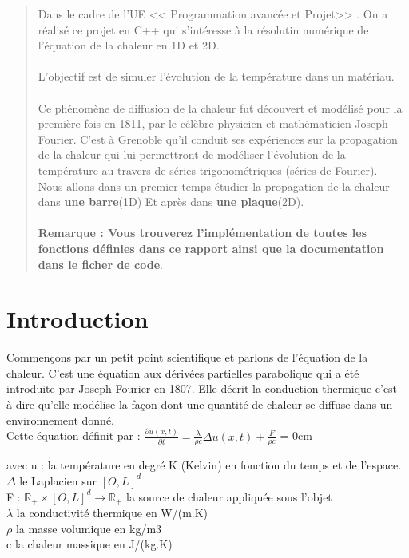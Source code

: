 \documentclass[french]{report}
\begin{document}
\begin{abstract}
Dans le cadre de l'UE << Programmation avancée et Projet>> . On a réalisé ce projet  en C++ qui s'intéresse à la résolutin numérique de l'équation de la chaleur en 1D et 2D.\\\\
L'objectif est de simuler l’évolution de la température dans un
matériau.\\\\
Ce phénomène de diffusion de la chaleur fut découvert et modélisé pour la première fois
en 1811, par le célèbre physicien et mathématicien Joseph Fourier. C'est à Grenoble qu'il
conduit ses expériences sur la propagation de la chaleur qui lui permettront de modéliser
l'évolution de la température au travers de séries trigonométriques (séries de Fourier). \\
Nous allons dans un premier temps  étudier la propagation de la chaleur dans \textbf{ une barre}(1D) Et après  dans \textbf{une plaque}(2D).\\\\

\small \textbf{Remarque : Vous trouverez l'implémentation de toutes les fonctions définies dans ce rapport ainsi que la documentation dans le ficher de code}.
\end{abstract}

\tableofcontents





\chapter{Introduction }
Commençons par un petit point scientifique et parlons de l'équation de la chaleur. C'est une équation aux dérivées partielles parabolique qui a été introduite par Joseph Fourier en 1807. Elle décrit la conduction thermique c'est-à-dire qu'elle modélise la façon dont une quantité de chaleur se diffuse dans un environnement donné. \\ 
Cette équation définit par : 
\bigbreak
    $ \frac{\partial u(x,t)}{\partial t} =\frac{\lambda}{\rho c} \Delta u(x,t) + \frac{F}{\rho c}$
    \leftskip=3cm
\bigbreak
\leftskip = 0cm

avec u :  la température en degré K (Kelvin) en fonction du temps et de l'espace. \\
$\Delta$ le Laplacien sur  $[O,L]^{d}$ \\
F : $\mathbb {R}_{+} \times [O,L]^{d} \to \mathbb {R}_{+}$ la source de chaleur appliquée sous l’objet \\
$\lambda$ la conductivité thermique en W/(m.K)\\
$\rho$ la masse volumique en kg/m3\\
c la chaleur massique en J/(kg.K) \\
\end{document}
